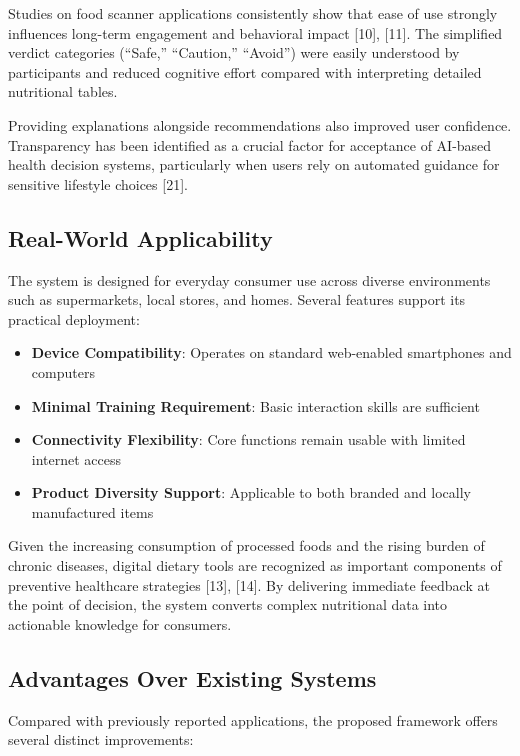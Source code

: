 \documentclass[conference]{IEEEtran}
\begin{document}
Studies on food scanner applications consistently show that ease of use strongly influences long-term engagement and behavioral impact [10], [11]. The simplified verdict categories (“Safe,” “Caution,” “Avoid”) were easily understood by participants and reduced cognitive effort compared with interpreting detailed nutritional tables.

Providing explanations alongside recommendations also improved user confidence. Transparency has been identified as a crucial factor for acceptance of AI-based health decision systems, particularly when users rely on automated guidance for sensitive lifestyle choices [21].

\subsection{Real-World Applicability}

The system is designed for everyday consumer use across diverse environments such as supermarkets, local stores, and homes. Several features support its practical deployment:

\begin{itemize}
    \item \textbf{Device Compatibility}: Operates on standard web-enabled smartphones and computers
    \item \textbf{Minimal Training Requirement}: Basic interaction skills are sufficient
    \item \textbf{Connectivity Flexibility}: Core functions remain usable with limited internet access
    \item \textbf{Product Diversity Support}: Applicable to both branded and locally manufactured items
\end{itemize}

Given the increasing consumption of processed foods and the rising burden of chronic diseases, digital dietary tools are recognized as important components of preventive healthcare strategies [13], [14]. By delivering immediate feedback at the point of decision, the system converts complex nutritional data into actionable knowledge for consumers.

\subsection{Advantages Over Existing Systems}

Compared with previously reported applications, the proposed framework offers several distinct improvements:
\end{document}
